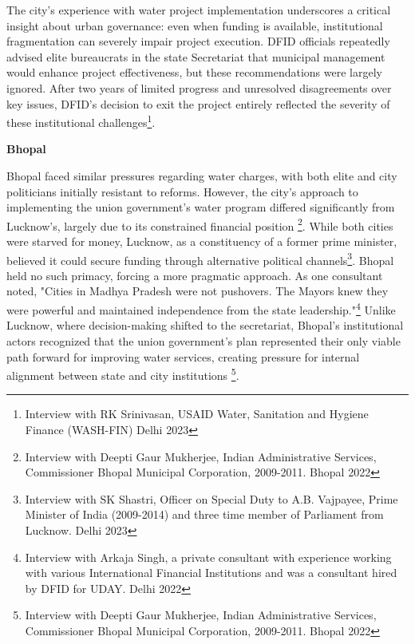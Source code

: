 The city's experience with water project implementation underscores a critical insight about urban governance: even when funding is available, institutional fragmentation can severely impair project execution. DFID officials repeatedly advised elite bureaucrats in the state Secretariat that municipal management would enhance project effectiveness, but these recommendations were largely ignored. After two years of limited progress and unresolved disagreements over key issues, DFID's decision to exit the project entirely reflected the severity of these institutional challenges\footnote{Interview with RK Srinivasan, USAID Water, Sanitation and Hygiene Finance (WASH-FIN) Delhi 2023}.

\vspace{5mm}
\textbf{Bhopal}

Bhopal faced similar pressures regarding water charges, with both elite and city politicians initially resistant to reforms. However, the city's approach to implementing the union government's water program differed significantly from Lucknow's, largely due to its constrained financial position \footnote{Interview with Deepti Gaur Mukherjee, Indian Administrative Services, Commissioner Bhopal Municipal Corporation, 2009-2011. Bhopal 2022}. While both cities were starved for money, Lucknow, as a constituency of a former prime minister, believed it could secure funding through alternative political channels\footnote{Interview with SK Shastri, Officer on Special Duty to A.B. Vajpayee, Prime Minister of India (2009-2014) and three time member of Parliament from Lucknow. Delhi 2023}. Bhopal held no such primacy, forcing a more pragmatic approach. As one consultant noted, "Cities in Madhya Pradesh were not pushovers. The Mayors knew they were powerful and maintained independence from the state leadership."\footnote{Interview with Arkaja Singh, a private consultant with experience working with various International Financial Institutions and was a consultant hired by DFID for UDAY. Delhi 2022
} Unlike Lucknow, where decision-making shifted to the secretariat, Bhopal's institutional actors recognized that the union government's plan represented their only viable path forward for improving water services, creating pressure for internal alignment between state and city institutions \footnote{Interview with Deepti Gaur Mukherjee, Indian Administrative Services, Commissioner Bhopal Municipal Corporation, 2009-2011. Bhopal 2022}.

